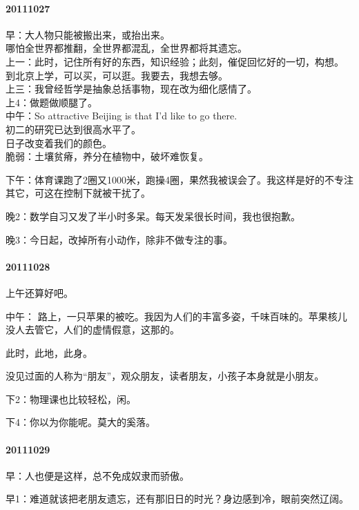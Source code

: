 \documentclass[UTF8]{book}
\begin{document}
\paragraph{20111027}
早：大人物只能被搬出来，或抬出来。\\
哪怕全世界都推翻，全世界都混乱，全世界都将其遗忘。\\

上一：此时，记住所有好的东西，知识经验；此刻，催促回忆好的一切，构想。\\
到北京上学，可以买，可以逛。我要去，我想去够。\\

上三：我曾经哲学是抽象总括事物，现在改为细化感情了。\\

上4：做题做顺腿了。\\

中午：So attractive Beijing is that I'd like to go there.\\
初二的研究已达到很高水平了。\\
日子改变着我们的颜色。\\
脆弱：土壤贫瘠，养分在植物中，破坏难恢复。

下午：体育课跑了2圈又1000米，跑操4圈，果然我被误会了。我这样是好的不专注其它，可这在控制下就被干扰了。

晚2：数学自习又发了半小时多呆。每天发呆很长时间，我也很抱歉。

晚3：今日起，改掉所有小动作，除非不做专注的事。

\paragraph{20111028}
上午还算好吧。

中午： 路上，一只苹果的被吃。我因为人们的丰富多姿，千味百味的。苹果核儿没人去管它，人们的虚情假意，这那的。

此时，此地，此身。

没见过面的人称为“朋友”，观众朋友，读者朋友，小孩子本身就是小朋友。

下2：物理课也比较轻松，闲。

下4：你以为你能呢。莫大的奚落。


\paragraph{20111029}

早：人也便是这样，总不免成奴隶而骄傲。

早1：难道就该把老朋友遗忘，还有那旧日的时光？身边感到冷，眼前突然辽阔。
\end{document}
